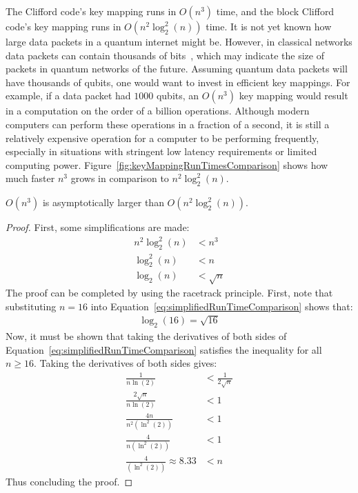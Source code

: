 The Clifford code's key mapping runs in $O\left(n^3\right)$ time, and the block Clifford code's key mapping runs in $O\left(n^2 \log_2^2 (n)\right)$ time. It is not yet known how large data packets in a quantum internet might be. However, in classical networks data packets can contain thousands of bits~\cite{rfc879}, which may indicate the size of packets in quantum networks of the future. Assuming quantum data packets will have thousands of qubits, one would want to invest in efficient key mappings. For example, if a data packet had $1000$ qubits, an $O\left(n^3\right)$ key mapping would result in a computation on the order of a billion operations. Although modern computers can perform these operations in a fraction of a second, it is still a relatively expensive operation for a computer to be performing frequently, especially in situations with stringent low latency requirements or limited computing power. Figure~\ref{fig:keyMappingRunTimesComparison} shows how much faster $n^3$ grows in comparison to $n^2 \log_2^2 (n)$.

\begin{myLemmarep}
$O\left(n^3\right)$ is asymptotically larger than $O\left(n^2 \log_2^2 (n)\right)$.
\end{myLemmarep}
\begin{proof}
First, some simplifications are made:
\begin{align}
n^2 \log_2^2 (n) &< n^3\\
\log_2^2 (n) &< n \\
\log_2 (n) &< \sqrt{n} \label{eq:simplifiedRunTimeComparison}
\end{align}
 The proof can be completed by using the racetrack principle. First, note that substituting $n = 16$ into Equation~\eqref{eq:simplifiedRunTimeComparison} shows that:
\begin{align}
\log_2 (16) = \sqrt{16}
\end{align}
Now, it must be shown that taking the derivatives of both sides of Equation~\eqref{eq:simplifiedRunTimeComparison} satisfies the inequality for all $n \geq 16$. Taking the derivatives of both sides gives:
\begin{align}
\frac{1}{n \ln (2)} &< \frac{1}{2\sqrt{n}}\\
\frac{2\sqrt{n}}{n \ln (2)} &< 1\\
\frac{4n}{n^2 (\ln^2 (2))} &< 1\\
\frac{4}{n (\ln^2 (2))} &< 1\\
\frac{4}{(\ln^2 (2))} \approx 8.33 &< n
\end{align}
Thus concluding the proof.
\end{proof}

